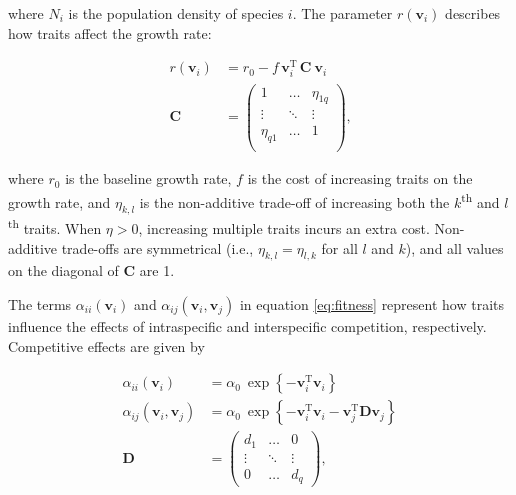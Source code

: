 \noindent where $N_i$ is the population density of  species $i$.
The parameter $r(\mathbf{v}_i)$ describes how traits affect
the growth rate:

\begin{equation} \label{eq:growth-rate}
\begin{split}
    r(\mathbf{v}_i) &= r_0 - f \, \mathbf{v}_i^{\textrm{T}} \, \mathbf{C} ~ \mathbf{v}_{i} \\
    \mathbf{C} &= \begin{pmatrix}
        1         & \ldots & \eta_{1q} \\
        \vdots    & \ddots & \vdots \\
        \eta_{q1} & \ldots & 1      \\
        \end{pmatrix}
    \textrm{,}
\end{split}
\end{equation}

\noindent where $r_0$ is the baseline growth rate,
$f$ is the cost of increasing traits on the growth rate, and
$\eta_{k,l}$ is the non-additive trade-off of increasing both the
$k$\textsuperscript{th} and $l$\textsuperscript{th} traits.
When $\eta > 0$, increasing multiple traits incurs an extra cost.
Non-additive trade-offs are symmetrical (i.e., $\eta_{k,l} = \eta_{l,k}$ for all
$l$ and $k$), and all values on the diagonal of $\mathbf{C}$ are 1.


The terms $\alpha_{ii}(\mathbf{v}_i)$ and
$\alpha_{ij}(\mathbf{v}_i, \mathbf{v}_j)$
in equation \ref{eq:fitness} represent how traits influence the effects
of intraspecific and interspecific competition, respectively.
Competitive effects are given by

\begin{equation} \label{eq:competition}
\begin{split}
    \alpha_{ii}(\mathbf{v}_i) &= \alpha_0 ~\exp \left\{
        - \mathbf{v}_i^{\textrm{T}}
        \mathbf{v}_i \right\} \\
    \alpha_{ij}(\mathbf{v}_i, \mathbf{v}_j) &= \alpha_0 ~\exp \left\{
        - \mathbf{v}_i^{\textrm{T}} \mathbf{v}_i -
        \mathbf{v}_j^{\textrm{T}} \mathbf{D} \mathbf{v}_j \right\} \\
    \mathbf{D} &= \begin{pmatrix}
        d_1     & \ldots    & 0 \\
        \vdots  & \ddots    & \vdots \\
        0       & \ldots    & d_q
        \end{pmatrix}
	\textrm{,}
\end{split}
\end{equation}

